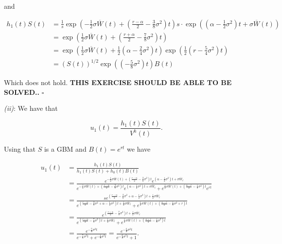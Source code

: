 \documentclass[
]{book}
\begin{document}
and

\begin{align*}
h_1(t)S(t)&=\frac{1}{s}\exp\left(-\frac{1}{2}\sigma\overline{W}(t)+\left(\frac{r-\alpha}{2}-\frac{3}{8}\sigma^2\right)t\right)s\cdot\exp\left(\left(\alpha-\frac{1}{2}\sigma^2\right)t+\sigma\overline{W}(t)\right)\\
&=\exp\left(\frac{1}{2}\sigma\overline{W}(t)+\left(\frac{r+\alpha}{2}-\frac{7}{8}\sigma^2\right)t\right)\\
&=\exp\left(\frac{1}{2}\sigma\overline{W}(t)+\frac{1}{2}\left(\alpha-\frac{2}{4}\sigma^2\right)t\right)\exp\left(\frac{1}{2}\left(r-\frac{5}{4}\sigma^2\right)t\right)\\
&=(S(t))^{1/2}\exp\left(\left(-\frac{5}{8}\sigma^2\right)t\right)B(t)
\end{align*}

Which does not hold. \textbf{THIS EXERCISE SHOULD BE ABLE TO BE SOLVED..} \(\square\)

\emph{(ii)}: We have that

\[
u_1(t)=\frac{h_1(t)S(t)}{V^h(t)}.
\]

Using that \(S\) is a GBM and \(B(t)=e^{rt}\) we have

\begin{align*}
u_1(t)&=\frac{h_1(t)S(t)}{h_1(t)S(t)+h_0(t)B(t)}\\
&=\frac{e^{-\frac{1}{2}\sigma\overline{W}(t)+\left(\frac{r-\alpha}{2}-\frac{3}{8}\sigma^2\right)t}e^{\left(\alpha-\frac{1}{2}\sigma^2\right)t+\sigma \overline{W}_t}}{e^{-\frac{1}{2}\sigma\overline{W}(t)+\left(\frac{r-\alpha}{2}-\frac{3}{8}\sigma^2\right)t}e^{\left(\alpha-\frac{1}{2}\sigma^2\right)t+\sigma \overline{W}_t}+e^{\frac{1}{2}\sigma\overline{W}(t)+\left(\frac{\alpha - r}{2}-\frac{1}{8}\sigma^2\right)t}e^{rt}}\\
&=\frac{se^{\left(\frac{r-\alpha}{2}-\frac{3}{8}\sigma^2+\alpha-\frac{1}{2}\sigma^2\right)t+\frac{1}{2}\sigma \overline{W}_t}}{e^{\left(\frac{r-\alpha}{2}-\frac{3}{8}\sigma^2+\alpha-\frac{1}{2}\sigma^2\right)t+\frac{1}{2}\sigma \overline{W}_t}+e^{\frac{1}{2}\sigma\overline{W}(t)+\left(\frac{\alpha - r}{2}-\frac{1}{8}\sigma^2+r\right)t}}\\
&=\frac{e^{\left(\frac{r+\alpha}{2}-\frac{7}{8}\sigma^2\right)t+\frac{1}{2}\sigma \overline{W}_t}}{e^{\left(\frac{r+\alpha}{2}-\frac{7}{8}\sigma^2\right)t+\frac{1}{2}\sigma \overline{W}_t}+e^{\frac{1}{2}\sigma\overline{W}(t)+\left(\frac{\alpha + r}{2}-\frac{1}{8}\sigma^2\right)t}}\\
&=\frac{e^{-\frac{7}{8}\sigma^2t}}{e^{-\frac{7}{8}\sigma^2t}+e^{-\frac{1}{8}\sigma^2t}}=\frac{e^{-\frac{6}{8}\sigma^2t}}{e^{-\frac{6}{8}\sigma^2t}+1}.
\end{align*}
\end{document}
